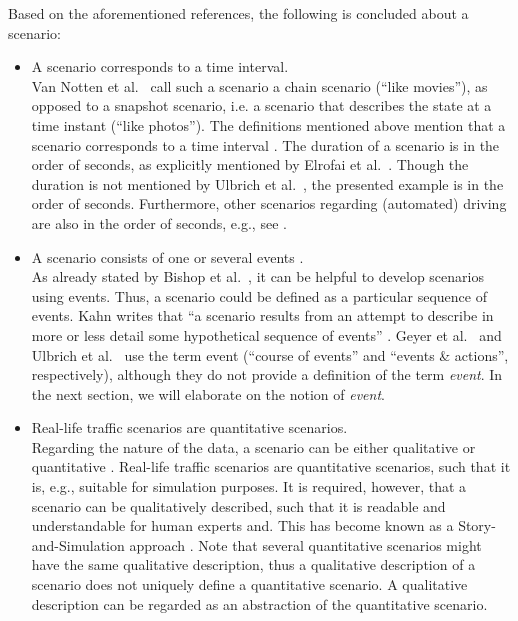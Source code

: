 \documentclass[10pt,final,a4paper,oneside,onecolumn]{article}
\begin{document}
Based on the aforementioned references, the following is concluded about a scenario:
\begin{itemize}
	\item A scenario corresponds to a time interval. \\
	Van Notten et al.\ \cite{vannotten2003updated} call such a scenario a chain scenario (``like movies''), as opposed to a snapshot scenario, i.e. a scenario that describes the state at a time instant (``like photos''). The definitions mentioned above mention that a scenario corresponds to a time interval \cite{go2004blind, geyer2014, ulbrich2015, elrofai2016scenario}. The duration of a scenario is in the order of seconds, as explicitly mentioned by Elrofai et al.\ \cite{elrofai2016scenario}. Though the duration is not mentioned by Ulbrich et al.\ \cite{ulbrich2015}, the presented example is in the order of seconds. Furthermore, other scenarios regarding (automated) driving are also in the order of seconds, e.g., see \cite{gietelink2006development, zofka2015datadrivetrafficscenarios, roesener2017comprehensive, karaduman2013interactivebehavior, hulshof2013autonomous, englund2016grand}.
	
	\item A scenario consists of one or several events \cite{vannotten2003updated, go2004blind, geyer2014, ulbrich2015, kahn1962, englund2016grand, schoemaker1993multiple, cuppens2002alert}. \\
	As already stated by Bishop et al.\ \cite{bishop2007scentechniques}, it can be helpful to develop scenarios using events. Thus, a scenario could be defined as a particular sequence of events.  Kahn writes that ``a scenario results from an attempt to describe in more or less detail some hypothetical sequence of events'' \cite{kahn1962}. Geyer et al.\ \cite{geyer2014} and Ulbrich et al.\ \cite{ulbrich2015} use the term event (``course of events'' and ``events \& actions'', respectively), although they do not provide a definition of the term \emph{event}. In the next section, we will elaborate on the notion of \emph{event}.
	
	\item Real-life traffic scenarios are quantitative scenarios. \\
	Regarding the nature of the data, a scenario can be either qualitative or quantitative \cite{vannotten2003updated}. Real-life traffic scenarios are quantitative scenarios, such that it is, e.g., suitable for simulation purposes. It is required, however, that a scenario can be qualitatively described, such that it is readable and understandable for human experts and. This has become known as a Story-and-Simulation approach \cite{alcamo2001scenarios}. Note that several quantitative scenarios might have the same qualitative description, thus a qualitative description of a scenario does not uniquely define a quantitative scenario. A qualitative description can be regarded as an abstraction of the quantitative scenario.
	

\end{itemize}
\end{document}
